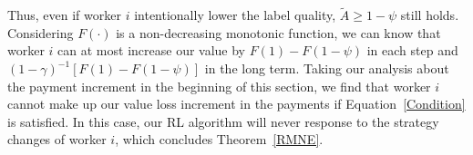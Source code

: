 Thus, even if worker $i$ intentionally lower the label quality, $\tilde{A}\geq 1-\psi$ still holds.
Considering $F(\cdot)$ is a non-decreasing monotonic function, we can know that worker $i$ can at most increase our value by $F(1)-F(1-\psi)$ in each step and $(1-\gamma)^{-1}[F(1)-F(1-\psi)]$ in the long term.
Taking our analysis about the payment increment in the beginning of this section, we find that worker $i$ cannot make up our value loss increment in the payments if Equation~\ref{Condition} is satisfied.
In this case, our RL algorithm will never response to the strategy changes of worker $i$, which concludes Theorem~\ref{RMNE}.





